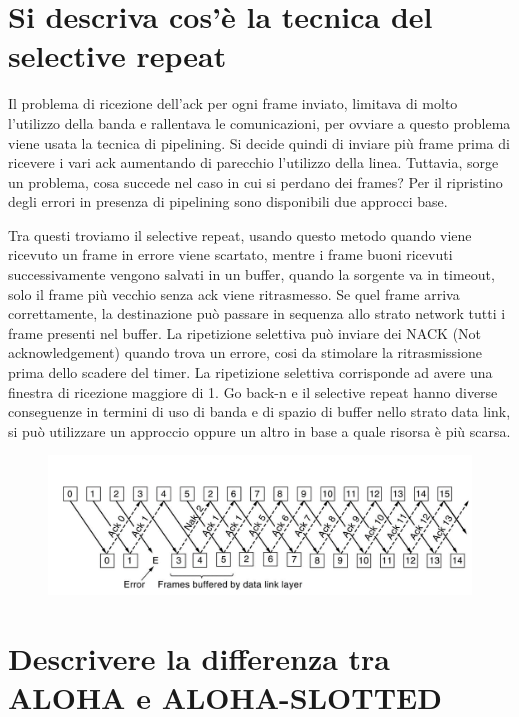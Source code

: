 \section{Si descriva cos'è la tecnica del selective repeat}

Il problema di ricezione dell’ack per ogni frame inviato, limitava di molto l’utilizzo della banda e rallentava le comunicazioni, per ovviare a questo problema viene usata la tecnica di pipelining. Si decide quindi di inviare più frame prima di ricevere i vari ack aumentando di parecchio l’utilizzo della linea. Tuttavia, sorge un problema, cosa succede nel caso in cui si perdano dei frames? Per il ripristino degli errori in presenza di pipelining sono disponibili due approcci base.

Tra questi troviamo il selective repeat, usando questo metodo quando viene ricevuto un frame in errore viene scartato, mentre i frame buoni ricevuti successivamente vengono salvati in un buffer, quando la sorgente va in timeout, solo il frame più vecchio senza ack viene ritrasmesso. Se quel frame arriva correttamente, la destinazione può passare in sequenza allo strato network tutti i frame presenti nel buffer.
La ripetizione selettiva può inviare dei NACK (Not acknowledgement) quando trova un errore, cosi da stimolare la ritrasmissione prima dello scadere del timer.
La ripetizione selettiva corrisponde ad avere una finestra di ricezione maggiore di 1.
Go back-n e il selective repeat hanno diverse conseguenze in termini di uso di banda e di spazio di buffer nello strato data link, si può utilizzare un approccio oppure un altro in base a quale risorsa è più scarsa.

\begin{figure}[H]
\centering
\includegraphics[scale=0.8]{res/img/21_SelectiveRepeat.png}
\end{figure}
 
\section{Descrivere la differenza tra ALOHA e ALOHA-SLOTTED}


